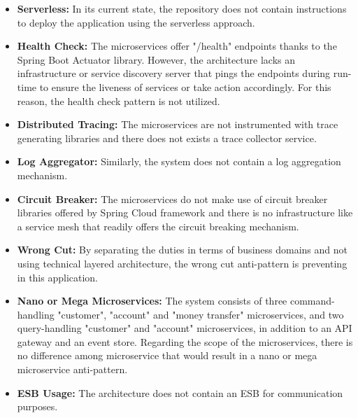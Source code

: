 \documentclass{Configuration_Files/PoliMi3i_thesis}
\begin{document}
\begin{itemize}
    \item \textbf{Serverless:} In its current state, the repository does not contain instructions to deploy the application using the serverless approach.
    
    \item \textbf{Health Check:} The microservices offer "/health" endpoints thanks to the Spring Boot Actuator\footnotemark[85] library.
    However, the architecture lacks an infrastructure or service discovery server that pings the endpoints during run-time to ensure the liveness of services or take action accordingly.
    For this reason, the health check pattern is not utilized.
    
    \item \textbf{Distributed Tracing:} The microservices are not instrumented with trace generating libraries and there does not exists a trace collector service.
    
    \item \textbf{Log Aggregator:} Similarly, the system does not contain a log aggregation mechanism.

    \item \textbf{Circuit Breaker:} The microservices do not make use of circuit breaker libraries offered by Spring Cloud framework and there is no infrastructure like a service mesh that readily offers the circuit breaking mechanism.
    
    \item \textbf{Wrong Cut:} By separating the duties in terms of business domains and not using technical layered architecture, the wrong cut anti-pattern is preventing in this application.
    
    \item \textbf{Nano or Mega Microservices:} The system consists of three command-handling "customer", "account" and "money transfer" microservices,  and two query-handling "customer" and "account" microservices, in addition to an API gateway and an event store.
    Regarding the scope of the microservices, there is no difference among microservice that would result in a nano or mega microservice anti-pattern.
    
    \item \textbf{ESB Usage:} The architecture does not contain an ESB for communication purposes.
    

\end{itemize}
\end{document}
